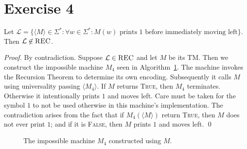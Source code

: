 \documentclass[11pt]{llncs}
\begin{document}
\section*{Exercise 4}
\begin{lemma}
Let $\mathcal{L} = \{
    \langle M \rangle \in \Sigma^*:
    \forall w \in \Sigma^*:
    M(w) \text{ prints 1 before immediately moving left}
\}$. Then $\mathcal{L} \not \in \textsc{REC}$.
\end{lemma}
\begin{proof}
By contradiction. Suppose $\mathcal{L} \in \textsc{REC}$ and let $M$ be its TM.
Then we construct the impossible machine $M_4$ seen in Algorithm~\ref{alg.ex4}.
The machine invokes the Recursion Theorem to determine its own encoding.
Subsequently it calls $M$ using universality passing $\langle M_4 \rangle$. If
$M$ returns \textsc{True}, then $M_4$ terminates. Otherwise it intentionally
prints $1$ and moves left. Care must be taken for the symbol $1$ to not be used
otherwise in this machine's implementation. The contradiction arises from the
fact that if $M_4(\langle M \rangle)$ return \textsc{True}, then $M$ does not
ever print $1$; and if it is \textsc{False}, then $M$ prints $1$ and moves left.
\qed
\end{proof}

\begin{figure}[t]
\begin{algorithm}[H]
  \caption{\label{alg.ex4}
      The impossible machine $M_4$ constructed using $M$.
  }
  \begin{algorithmic}[1]
          \State{}
        \EndIf
        \State{}
      \EndFunction
  \end{algorithmic}
\end{algorithm}
\end{figure}
\end{document}
